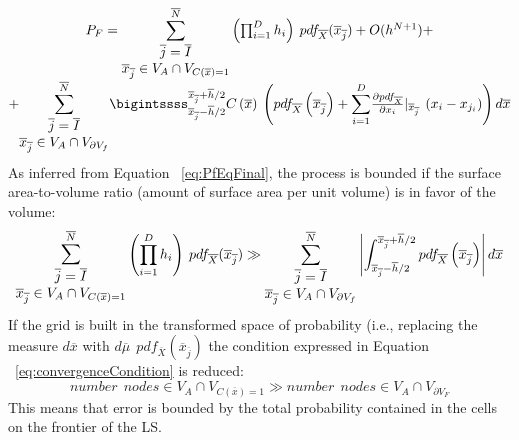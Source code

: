  \begin{equation}
 \label{eq:PfEqFinal}
 \begin{matrix}
P_{F} = \mathlarger{\sum}_{\begin{matrix}
\overline{j}=\overline{I} \\ \overline{x}_{\overline{j}} \in V_{A} \cap
V_{C(\overline{x})=1} \end{matrix}}^{\overline{N}}
\left ( \prod_{i=1}^{D}
 h_{i} \right )
\: pdf_{\overline{X}} ( \overline{x}_{\overline{j}}) + O(h^{N+1}) +
 \\
 + \mathlarger{\sum}_{\begin{matrix}
\overline{j}=\overline{I} \\ \overline{x}_{\overline{j}} \in V_{A} \cap
V_{\partial V_{f}} \end{matrix}}^{\overline{N}}
\bigintssss_{\overline{x}_{\overline{j}} -
\overline{h}/2}^{\overline{x}_{\overline{j}} + \overline{h}/2} C\left (
\overline{x} \right )\: \left ( pdf_{\overline{X}}\left (
\overline{x}_{\overline{j}} \right ) +
\mathlarger{\sum}_{i=1}^{D} \frac{\partial pdf_{\overline{X}}}{\partial
x_{i}}|_{\overline{x}_{\overline{j}}} \: \left ( x_{i} - x_{j_{i}} \right ) \right )
d\overline{x}
\end{matrix}
 \end{equation}
As inferred from Equation ~\ref{eq:PfEqFinal}, the process is bounded if the
surface area-to-volume ratio (amount of surface area per unit volume) is
in favor of the volume:
\begin{equation}
\label{eq:convergenceCondition}
\mathlarger{\sum}_{\begin{matrix}
\overline{j}=\overline{I} \\ \overline{x}_{\overline{j}} \in V_{A} \cap
V_{C(\overline{x})=1} \end{matrix}}^{\overline{N}}
\left ( \prod_{i=1}^{D}
 h_{i} \right )
\: pdf_{\overline{X}} ( \overline{x}_{\overline{j}})
\gg
\sum_{\begin{matrix}
\overline{j}=\overline{I} \\ \overline{x}_{\overline{j}} \in V_{A} \cap
V_{\partial V_{f}} \end{matrix}}^{\overline{N}}
\left | \int_{\overline{x}_{\overline{j}} -
\overline{h}/2}^{\overline{x}_{\overline{j}} + \overline{h}/2}   pdf_{\overline{X}}\left (
\overline{x}_{\overline{j}} \right )  \right |
d\overline{x}
\end{equation}
If the grid is built in the transformed space of probability (i.e., replacing the measure $d\overline{x}$ with $d \overline{\mu }\: \: pdf_{\overline{X}}\left ( \overline{x}_{\overline{j}} \right )$ the condition expressed in Equation ~\ref{eq:convergenceCondition} is reduced:
\begin{equation}
number \: \:  nodes \in V_{A} \cap V_{C(\overline{x})=1} \gg number \: \:  nodes  \in V_{A} \cap V_{\partial V_{F}}
\end{equation}
This means that error is bounded by the total probability contained in the cells on the frontier of the LS.

